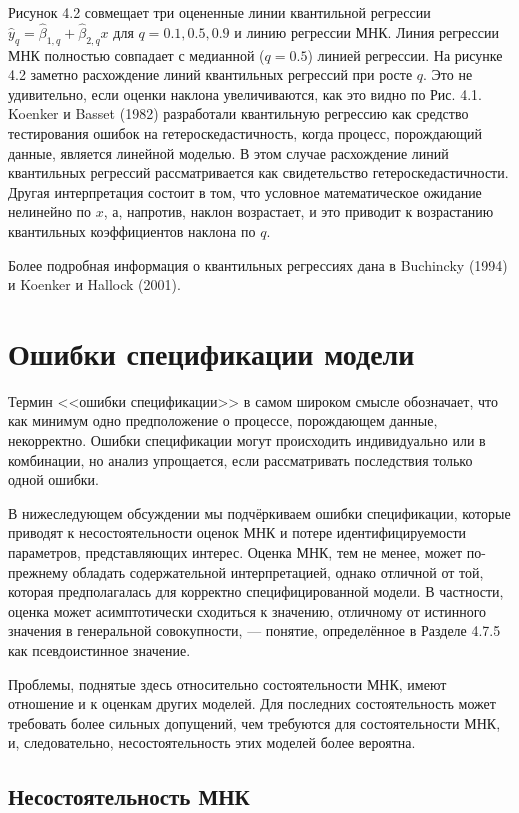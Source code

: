 Рисунок 4.2 совмещает три оцененные линии квантильной регрессии $\hat{y}_q = \hat{\beta}_{1,q}+\hat{\beta}_{2,q}x$ для $q=0.1, 0.5, 0.9$ и линию регрессии МНК. Линия регрессии МНК полностью совпадает с медианной ($q=0.5$) линией регрессии. На рисунке 4.2 заметно расхождение линий квантильных регрессий при росте $q$. Это не удивительно, если оценки наклона увеличиваются, как это видно по Рис. 4.1. Koenker и Basset (1982) разработали квантильную регрессию как средство тестирования ошибок на гетероскедастичность, когда процесс, порождающий данные, является линейной моделью. В этом случае расхождение линий квантильных регрессий рассматривается как свидетельство гетероскедастичности. Другая интерпретация состоит в том, что условное математическое ожидание нелинейно по $x$, а, напротив, наклон возрастает, и это приводит к возрастанию квантильных коэффициентов наклона по $q$.

Более подробная информация о квантильных регрессиях дана в Buchincky (1994) и Koenker и Hallock (2001).

\section{Ошибки спецификации модели}

Термин <<ошибки спецификации>> в самом широком смысле обозначает, что как минимум одно предположение о процессе, порождающем данные, некорректно. Ошибки спецификации могут происходить индивидуально или в комбинации, но анализ упрощается, если рассматривать последствия только одной ошибки.

В нижеследующем обсуждении мы подчёркиваем ошибки спецификации, которые приводят к несостоятельности оценок МНК и потере идентифицируемости параметров, представляющих интерес. Оценка МНК, тем не менее, может по-прежнему обладать содержательной интерпретацией, однако отличной от той, которая предполагалась для корректно специфицированной модели. В частности, оценка может асимптотически сходиться к значению, отличному от истинного значения в генеральной совокупности, --- понятие, определённое в Разделе 4.7.5 как псевдоистинное значение.

Проблемы, поднятые здесь относительно состоятельности МНК, имеют отношение и к оценкам других моделей. Для последних состоятельность может требовать более сильных допущений, чем требуются для состоятельности МНК, и, следовательно, несостоятельность этих моделей более вероятна. 

\subsection{Несостоятельность МНК}

